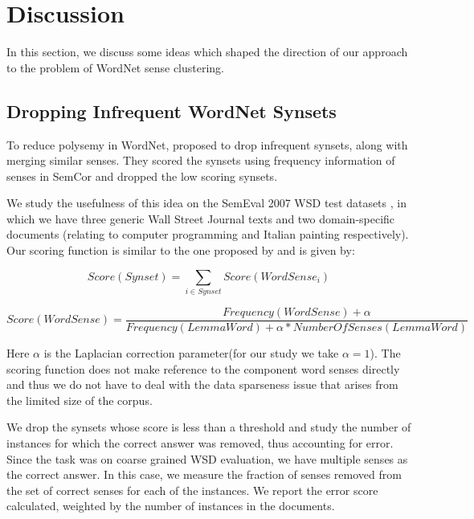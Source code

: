 \section{Discussion}
In this section, we discuss some ideas which shaped the direction of our approach to the problem of WordNet sense clustering.

\subsection{Dropping Infrequent WordNet Synsets}
To reduce polysemy in WordNet, \citep{Mihalcea01ez.wordnet:principles} proposed to drop infrequent synsets, along with merging similar senses. They scored the synsets using frequency information of senses in SemCor \citep{SemCor} and dropped the low scoring synsets. 

We study the usefulness of this idea on the SemEval 2007 WSD test datasets \citep{navigli-litkowski:SemEval-2007}, in which we have three generic Wall Street Journal texts and two domain-specific documents (relating to computer programming and Italian painting respectively). Our scoring function is similar to the one proposed by \citep{Mihalcea01ez.wordnet:principles} and is given by:

\begin{equation}
Score(Synset) = \sum_{i \in Synset} Score(WordSense_i) 
\end{equation}

\begin{equation}
Score(WordSense) = \frac{Frequency(WordSense)+\alpha}{Frequency(LemmaWord) + \alpha*NumberOfSenses(LemmaWord)} 
\end{equation}

Here $\alpha$ is the Laplacian correction parameter(for our study we take $\alpha=1$).
The scoring function does not make reference to the component word senses directly and thus we do not have to deal with the data sparseness issue that arises from the limited size of the corpus.

We drop the synsets whose score is less than a threshold and study the number of instances for which the correct answer was removed, thus accounting for error. Since the task was on coarse grained WSD evaluation, we have multiple senses as the correct answer. In this case, we measure the fraction of senses removed from the set of correct senses for each of the instances. We report the error score calculated, weighted by the number of instances in the documents.

